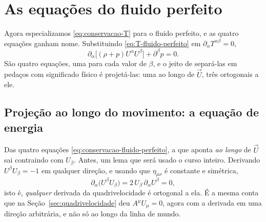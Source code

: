 \documentclass[12pt,a4paper,oneside]{book}
\theoremstyle{rgplain}
\theoremstyle{rgremark}
\begin{document}
\section{As equações do fluido perfeito}
\label{sec:euler}

Agora especializamos \eqref{eq:conservacao-T} para o fluido perfeito, e as
quatro equações ganham nome. Substituindo \eqref{eq:T-fluido-perfeito} em
$\partial_\alpha T^{\alpha\beta}=0$,
\begin{equation}
  \partial_\alpha\bigl[(\rho+p)U^\alpha U^\beta\bigr]+\partial^\beta p=0 .
  \label{eq:conservacao-fluido-perfeito}
\end{equation}
São quatro equações, uma para cada valor de $\beta$, e o jeito de separá-las
em pedaços com significado físico é projetá-las: uma ao longo de $\vec U$, três
ortogonais a ele.

\subsection*{Projeção ao longo do movimento: a equação de energia}

Das quatro equações \eqref{eq:conservacao-fluido-perfeito}, a que aponta
\emph{ao longo} de $\vec U$ sai contraindo com $U_\beta$. Antes, um lema que será usado o curso inteiro. Derivando
$U^\beta U_\beta=-1$ em qualquer direção, e usando que $\eta_{\mu\nu}$ é
constante e simétrica,
\begin{equation}
  \partial_\alpha\bigl(U^\beta U_\beta\bigr)
   =2\,U_\beta\,\partial_\alpha U^\beta=0 ,
  \label{eq:U-ortogonal-dU}
\end{equation}
isto é, \emph{qualquer} derivada da quadrivelocidade é ortogonal a ela. É a
mesma conta que na Seção~\ref{sec:quadrivelocidade} deu $A^\mu U_\mu=0$, agora
com a derivada em uma direção arbitrária, e não só ao longo da linha de mundo.
\end{document}
